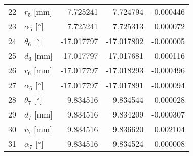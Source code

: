 \documentclass{standalone}%
\begin{document}
\begin{tabular}{llrrr}
22 &              $r_{5}$ [mm] &   7.725241 &   7.724794 &  -0.000446 \\
23 &  $\alpha_{5}$ [$\degree$] &   7.725241 &   7.725313 &   0.000072 \\
24 &  $\theta_{6}$ [$\degree$] & -17.017797 & -17.017802 &  -0.000005 \\
25 &              $d_{6}$ [mm] & -17.017797 & -17.017681 &   0.000116 \\
26 &              $r_{6}$ [mm] & -17.017797 & -17.018293 &  -0.000496 \\
27 &  $\alpha_{6}$ [$\degree$] & -17.017797 & -17.017891 &  -0.000094 \\
28 &  $\theta_{7}$ [$\degree$] &   9.834516 &   9.834544 &   0.000028 \\
29 &              $d_{7}$ [mm] &   9.834516 &   9.834209 &  -0.000307 \\
30 &              $r_{7}$ [mm] &   9.834516 &   9.836620 &   0.002104 \\
31 &  $\alpha_{7}$ [$\degree$] &   9.834516 &   9.834524 &   0.000008 \\
\bottomrule
\end{tabular}
%
\end{document}
